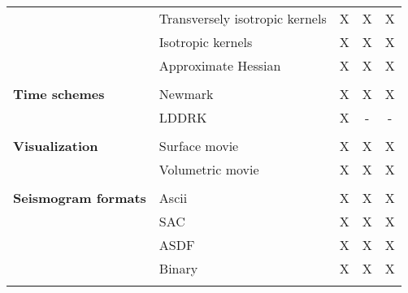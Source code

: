 \begin{table}[htp]
\begin{center}
\begin{tabular}{ l l c c c}
									& Transversely isotropic kernels  	& X     & X     & X \\
									& Isotropic kernels 						& X     & X     & X \\
									& Approximate Hessian     			& X     & X     & X \\
\hline
& & & & \\
{\bf Time schemes}			& Newmark    	& X     & X     & X \\
										& LDDRK			& X     & -     & - \\
\hline
& & & & \\
{\bf Visualization}			& Surface movie		& X     & X     & X \\
									& Volumetric movie	& X     & X     & X \\
\hline
& & & & \\
{\bf Seismogram formats}	& Ascii        		& X 	& X 	& X \\
										& SAC				& X	& X	& X \\
										& ASDF			& X	& X	& X \\
										& Binary			& X	& X	& X \\
%
\hline
& & & & \\ %
\end{tabular}
\end{center}
\end{table}



